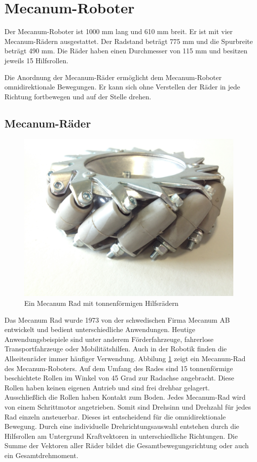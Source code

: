 \section{Mecanum-Roboter}
\label{sec:Mecanum-Roboter}

Der Mecanum-Roboter ist 1000 mm lang und 610 mm breit. Er ist mit vier Mecanum-Rädern ausgestattet. Der Radstand beträgt 775 mm und die Spurbreite beträgt 490 mm. Die Räder haben einen Durchmesser von 115 mm und besitzen jeweils 15 Hilfsrollen.

Die Anordnung der Mecanum-Räder ermöglicht dem Mecanum-Roboter omnidirektionale Bewegungen.
Er kann sich ohne Verstellen der Räder in jede Richtung fortbewegen und auf der Stelle drehen.

\subsection*{Mecanum-Räder}
\label{sec:Mecanum-Raeder}
\begin{figure}
\centering
 \includegraphics[width=.6\textwidth]{Abbildungen/Mecanumrad} 
\caption[Mecanum-Rad]{Ein Mecanum Rad mit tonnenförmigen Hilfsrädern}
\label{fig:Mecanum-Rad}
\end{figure}
Das Mecanum Rad wurde 1973 von der schwedischen Firma Mecanum AB entwickelt und bedient unterschiedliche Anwendungen. Heutige Anwendungsbeispiele sind unter anderem Förderfahrzeuge, fahrerlose Transportfahrzeuge oder Mobilitätshilfen. Auch in der Robotik finden die Allseitenräder immer häufiger Verwendung.
Abbilung \ref{fig:Mecanum-Rad} zeigt ein Mecanum-Rad des Mecanum-Roboters. Auf dem Umfang des Rades sind 15 tonnenförmige beschichtete Rollen im Winkel von 45 Grad zur Radachse angebracht. Diese Rollen haben keinen eigenen Antrieb und sind frei drehbar gelagert. Ausschließlich die Rollen haben Kontakt zum Boden.
Jedes Mecanum-Rad wird von einem Schrittmotor angetrieben. Somit sind Drehsinn und Drehzahl für jedes Rad einzeln ansteuerbar. Dieses ist entscheidend für die omnidirektionale Bewegung.
Durch eine individuelle Drehrichtungsauswahl entstehen durch die Hilfsrollen am Untergrund Kraftvektoren in unterschiedliche Richtungen. Die Summe der Vektoren aller Räder bildet die Gesamtbewegungsrichtung oder auch ein Gesamtdrehmoment.





















